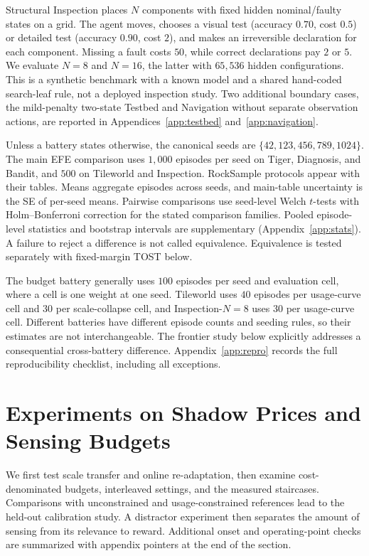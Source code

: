 Structural Inspection places $N$ components with fixed hidden nominal/faulty states on a grid. The agent moves, chooses a visual test (accuracy $0.70$, cost $0.5$) or detailed test (accuracy $0.90$, cost $2$), and makes an irreversible declaration for each component. Missing a fault costs $50$, while correct declarations pay $2$ or $5$. We evaluate $N{=}8$ and $N{=}16$, the latter with $65{,}536$ hidden configurations. This is a synthetic benchmark with a known model and a shared hand-coded search-leaf rule, not a deployed inspection study. Two additional boundary cases, the mild-penalty two-state Testbed and Navigation without separate observation actions, are reported in Appendices~\ref{app:testbed} and~\ref{app:navigation}.

Unless a battery states otherwise, the canonical seeds are $\{42,123,456,789,1024\}$. The main EFE comparison uses $1{,}000$ episodes per seed on Tiger, Diagnosis, and Bandit, and $500$ on Tileworld and Inspection. RockSample protocols appear with their tables. Means aggregate episodes across seeds, and main-table uncertainty is the SE of per-seed means. Pairwise comparisons use seed-level Welch $t$-tests with Holm--Bonferroni correction for the stated comparison families. Pooled episode-level statistics and bootstrap intervals are supplementary (Appendix~\ref{app:stats}). A failure to reject a difference is not called equivalence. Equivalence is tested separately with fixed-margin TOST below.

The budget battery generally uses $100$ episodes per seed and evaluation cell, where a cell is one weight at one seed. Tileworld uses $40$ episodes per usage-curve cell and $30$ per scale-collapse cell, and Inspection-$N{=}8$ uses $30$ per usage-curve cell. Different batteries have different episode counts and seeding rules, so their estimates are not interchangeable. The frontier study below explicitly addresses a consequential cross-battery difference. Appendix~\ref{app:repro} records the full reproducibility checklist, including all exceptions.

\section{Experiments on Shadow Prices and Sensing Budgets}
\label{sec:budget_experiments}

We first test scale transfer and online re-adaptation, then examine cost-denominated budgets, interleaved settings, and the measured staircases. Comparisons with unconstrained and usage-constrained references lead to the held-out calibration study. A distractor experiment then separates the amount of sensing from its relevance to reward. Additional onset and operating-point checks are summarized with appendix pointers at the end of the section.


